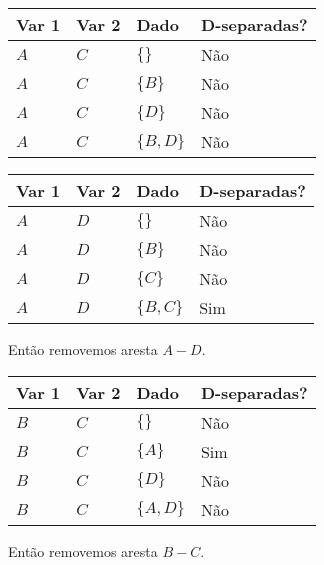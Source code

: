 \documentclass[paper=a4, fontsize=11pt]{scrartcl} %
\numberwithin{equation}{subsection}
\numberwithin{figure}{subsection}
\numberwithin{table}{subsection}
\numberwithin{definition}{subsection}
\numberwithin{theorem}{subsection}
\numberwithin{property}{subsection}
\numberwithin{proposition}{subsection}
\numberwithin{equation}{section}
\numberwithin{figure}{section}
\numberwithin{table}{section}
\numberwithin{definition}{section}
\numberwithin{theorem}{section}
\numberwithin{property}{section}
\numberwithin{proposition}{section}
\begin{document}
\begin{table}[H]
  \centering
    \begin{tabular}{|l|l|l|l|}
        \hline
        Var 1 & Var 2 & Dado          & D-separadas? \\ \hline
        $A$   & $C$   & $\{ \} $      & Não          \\ 
        $A$   & $C$   & $\{ B \}$     & Não          \\ 
        $A$   & $C$   & $\{ D \}$     & Não          \\ 
        $A$   & $C$   & $\{ B, D \} $ & Não          \\
        \hline
    \end{tabular}
\end{table}




\begin{table}[H]
  \centering
    \begin{tabular}{|l|l|l|l|}
        \hline
        Var 1 & Var 2 & Dado          & D-separadas? \\ \hline
        $A$   & $D$   & $\{ \} $      & Não          \\ 
        $A$   & $D$   & $\{ B \}$     & Não          \\ 
        $A$   & $D$   & $\{ C \}$     & Não          \\ 
        $A$   & $D$   & $\{ B, C \} $ & Sim       \\
        \hline
    \end{tabular}
\end{table}

Então removemos aresta $A-D$.



\begin{table}[H]
  \centering
    \begin{tabular}{|l|l|l|l|}
        \hline
        Var 1 & Var 2 & Dado          & D-separadas? \\ \hline
        $B$   & $C$   & $\{ \} $      & Não       \\ 
        $B$   & $C$   & $\{ A \}$     & Sim      \\ 
        $B$   & $C$   & $\{ D \}$     & Não          \\ 
        $B$   & $C$   & $\{ A, D \} $ & Não     \\
        \hline
    \end{tabular}
\end{table}

Então removemos aresta $B-C$.
\end{document}
